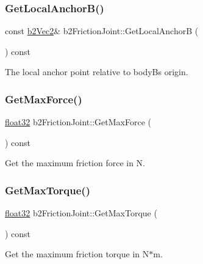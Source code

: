 \subsubsection{\texorpdfstring{GetLocalAnchorB()}{GetLocalAnchorB()}}
{\footnotesize\ttfamily const \mbox{\hyperlink{structb2_vec2}{b2\+Vec2}}\& b2\+Friction\+Joint\+::\+Get\+Local\+AnchorB (\begin{DoxyParamCaption}{ }\end{DoxyParamCaption}) const\hspace{0.3cm}{\ttfamily [inline]}}



The local anchor point relative to bodyB\textquotesingle{}s origin. 

\mbox{\label{classb2_friction_joint_ad5f66e02841b8402e5560476c3c478c9}} 
\subsubsection{\texorpdfstring{GetMaxForce()}{GetMaxForce()}}
{\footnotesize\ttfamily \mbox{\hyperlink{b2_settings_8h_aacdc525d6f7bddb3ae95d5c311bd06a1}{float32}} b2\+Friction\+Joint\+::\+Get\+Max\+Force (\begin{DoxyParamCaption}{ }\end{DoxyParamCaption}) const}



Get the maximum friction force in N. 

\mbox{\label{classb2_friction_joint_ae926972faa5846436cbcfe5772adc1f6}} 
\subsubsection{\texorpdfstring{GetMaxTorque()}{GetMaxTorque()}}
{\footnotesize\ttfamily \mbox{\hyperlink{b2_settings_8h_aacdc525d6f7bddb3ae95d5c311bd06a1}{float32}} b2\+Friction\+Joint\+::\+Get\+Max\+Torque (\begin{DoxyParamCaption}{ }\end{DoxyParamCaption}) const}



Get the maximum friction torque in N$\ast$m. 

